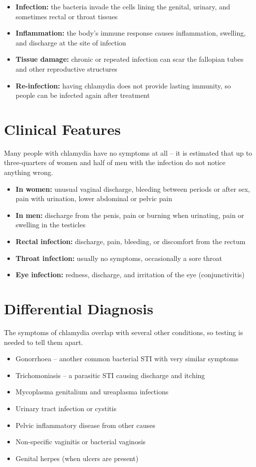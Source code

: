 \begin{itemize}
    \item \textbf{Infection:} the bacteria invade the cells lining the genital, urinary, and sometimes rectal or throat tissues
    \item \textbf{Inflammation:} the body's immune response causes inflammation, swelling, and discharge at the site of infection
    \item \textbf{Tissue damage:} chronic or repeated infection can scar the fallopian tubes and other reproductive structures
    \item \textbf{Re-infection:} having chlamydia does not provide lasting immunity, so people can be infected again after treatment
\end{itemize}

\section*{Clinical Features}
Many people with chlamydia have no symptoms at all -- it is estimated that up to three-quarters of women and half of men with the infection do not notice anything wrong.

\begin{itemize}
    \item \textbf{In women:} unusual vaginal discharge, bleeding between periods or after sex, pain with urination, lower abdominal or pelvic pain
    \item \textbf{In men:} discharge from the penis, pain or burning when urinating, pain or swelling in the testicles
    \item \textbf{Rectal infection:} discharge, pain, bleeding, or discomfort from the rectum
    \item \textbf{Throat infection:} usually no symptoms, occasionally a sore throat
    \item \textbf{Eye infection:} redness, discharge, and irritation of the eye (conjunctivitis)
\end{itemize}

\section*{Differential Diagnosis}
The symptoms of chlamydia overlap with several other conditions, so testing is needed to tell them apart.

\begin{itemize}
    \item Gonorrhoea -- another common bacterial STI with very similar symptoms
    \item Trichomoniasis -- a parasitic STI causing discharge and itching
    \item Mycoplasma genitalium and ureaplasma infections
    \item Urinary tract infection or cystitis
    \item Pelvic inflammatory disease from other causes
    \item Non-specific vaginitis or bacterial vaginosis
    \item Genital herpes (when ulcers are present)
\end{itemize}

